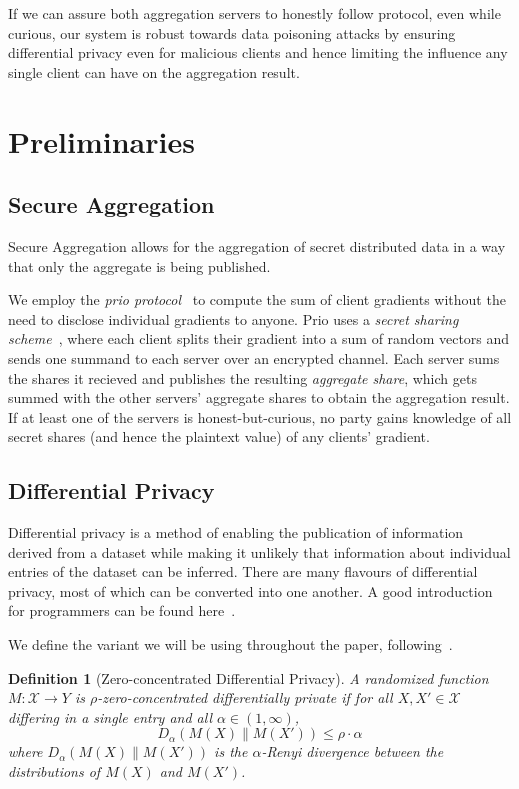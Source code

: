 \documentclass{article}
\newtheorem{definition}{Definition}
\begin{document}
If we can assure both aggregation servers to honestly follow protocol, even while curious, our system is robust towards data poisoning attacks by ensuring differential privacy even for malicious clients and hence limiting the influence any single client can have on the aggregation result.



\section{Preliminaries}
\subsection{Secure Aggregation}
Secure Aggregation allows for the aggregation of secret distributed data in a way that only the aggregate is being published.

We employ the \textit{prio protocol}~\cite{prio} to compute the sum of client gradients without the need to disclose individual gradients to anyone. Prio uses a \textit{secret sharing scheme}~\cite[Step 1 of scheme on page 3]{prio}, where each client splits their gradient into a sum of random vectors and sends one summand to each server over an encrypted channel. Each server sums the shares it recieved and publishes the resulting \textit{aggregate share}, which gets summed with the other servers' aggregate shares to obtain the aggregation result. If at least one of the servers is honest-but-curious, no party gains knowledge of all secret shares (and hence the plaintext value) of any clients' gradient.

\subsection{Differential Privacy}
Differential privacy is a method of enabling the publication of information derived from a dataset while making it unlikely that information about individual entries of the dataset can be inferred. There are many flavours of differential privacy, most of which can be converted into one another. A good introduction for programmers can be found here~\cite{near_abuah_2021}.

We define the variant we will be using throughout the paper, following~\cite{DBLP:journals/corr/BunS16}.
\begin{definition}[Zero-concentrated Differential Privacy]
A randomized function $M: \mathcal X\rightarrow Y$ is $\rho$-zero-concentrated differentially private if for all $X,X'\in \mathcal X$ differing in a single entry and all $\alpha\in(1,\infty)$,
$$D_\alpha(M(X)\|M(X'))\leq \rho\cdot\alpha$$
where $D_\alpha(M(X)\|M(X'))$ is the $\alpha$-Renyi divergence between the distributions of $M(X)$ and $M(X')$.
\end{definition}
\end{document}
